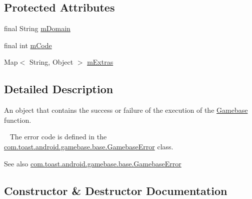 \subsection*{Protected Attributes}
\begin{DoxyCompactItemize}
\item 
final String \hyperlink{classcom_1_1toast_1_1android_1_1gamebase_1_1base_1_1_gamebase_exception_a38808479d669d94ecc48d88f09b25cc3}{m\+Domain}
\item 
final int \hyperlink{classcom_1_1toast_1_1android_1_1gamebase_1_1base_1_1_gamebase_exception_a9f61ede7ea550f6a6b745c63d81629c8}{m\+Code}
\item 
Map$<$ String, Object $>$ \hyperlink{classcom_1_1toast_1_1android_1_1gamebase_1_1base_1_1_gamebase_exception_a578bea0a20d1206af8e4ed5e163cfef6}{m\+Extras}
\end{DoxyCompactItemize}


\subsection{Detailed Description}
An object that contains the success or failure of the execution of the \hyperlink{classcom_1_1toast_1_1android_1_1gamebase_1_1_gamebase}{Gamebase} function. 

~\newline
 The error code is defined in the \hyperlink{classcom_1_1toast_1_1android_1_1gamebase_1_1base_1_1_gamebase_error}{com.\+toast.\+android.\+gamebase.\+base.\+Gamebase\+Error} class.

\begin{DoxySeeAlso}{See also}
\hyperlink{classcom_1_1toast_1_1android_1_1gamebase_1_1base_1_1_gamebase_error}{com.\+toast.\+android.\+gamebase.\+base.\+Gamebase\+Error} 
\end{DoxySeeAlso}


\subsection{Constructor \& Destructor Documentation}
\mbox{\label{classcom_1_1toast_1_1android_1_1gamebase_1_1base_1_1_gamebase_exception_a2db07ce4db851d795e5d61f772c4e9c0}} 
